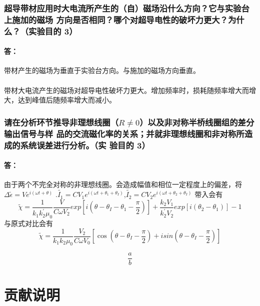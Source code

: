 \documentclass{ctexart}
\theoremstyle{ansstyle}
\begin{document}
\subsubsection{ 超导带材应用时大电流所产生的（自）磁场沿什么方向？它与实验台上施加的磁场
    方向是否相同？哪个对超导电性的破坏力更大？为什么？（实验目的 3） }
\paragraph{答：}
带材产生的磁场为垂直于实验台方向。与施加的磁场方向垂直。
\paragraph{}带材大电流产生的磁场对超导电性破坏力更大。增加频率时，损耗随频率增大而增大，达到峰值后随频率增大而减小。
\subsubsection{请在分析环节推导非理想线圈（$R \neq 0$）以及非对称半桥线圈组的差分输出信号与样
    品的交流磁化率的关系；并就非理想线圈和非对称所造成的系统误差进行分析。（实
    验目的 3）
}
\paragraph{答：}由于两个不完全对称的非理想线圈。会造成幅值和相位一定程度上的偏差，将$\Delta \widetilde{\epsilon}=Ve^{i(\omega t + \theta)}$
.$\widetilde{I_{1}}= CV_{1}e^{i(\omega t + \theta_{1}+\theta_{I})}$,$\widetilde{I_{2}}= CV_{2}e^{i(\omega t + \theta_{2}+\theta_{I})}$
带入会有$$
    \widetilde{\chi}=\frac{1}{k_{1}k^{'}_{2}\mu_{0}}\frac{V}{C\omega V_{2}}exp[i(\theta -\theta_{I}-\theta_{1}-\frac{\pi}{2})]+\frac{k_{2}V_{1}}{k^{'}_{2}V_{2}}exp[i(\theta_{2}-\theta_{1})] -1$$
与原式对比会有
$$ \widetilde{\chi} =\frac{1}{k_{1}k_{2}\mu_{0}}\frac{V_{2}}{C\omega V_{0}}[\cos(\theta-\theta_{I}-\frac{\pi}{2})+isin(\theta-\theta_{I}-\frac{\pi}{2})]    $$



\appendix
\begin{equation}
    \dfrac{a}{b}
\end{equation}

\section{贡献说明}
\end{document}
